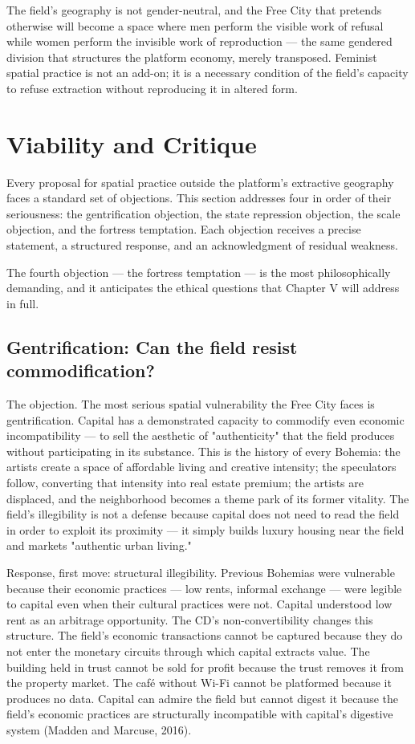 The field's geography is not gender-neutral, and the Free City that pretends otherwise will become a space where men perform the visible work of refusal while women perform the invisible work of reproduction — the same gendered division that structures the platform economy, merely transposed. Feminist spatial practice is not an add-on; it is a necessary condition of the field's capacity to refuse extraction without reproducing it in altered form.

\section{Viability and Critique}

Every proposal for spatial practice outside the platform's extractive geography faces a standard set of objections. This section addresses four in order of their seriousness: the gentrification objection, the state repression objection, the scale objection, and the fortress temptation. Each objection receives a precise statement, a structured response, and an acknowledgment of residual weakness.

The fourth objection — the fortress temptation — is the most philosophically demanding, and it anticipates the ethical questions that Chapter V will address in full.

\subsection{Gentrification: Can the field resist commodification?}

The objection. The most serious spatial vulnerability the Free City faces is gentrification. Capital has a demonstrated capacity to commodify even economic incompatibility — to sell the aesthetic of "authenticity" that the field produces without participating in its substance. This is the history of every Bohemia: the artists create a space of affordable living and creative intensity; the speculators follow, converting that intensity into real estate premium; the artists are displaced, and the neighborhood becomes a theme park of its former vitality. The field's illegibility is not a defense because capital does not need to read the field in order to exploit its proximity — it simply builds luxury housing near the field and markets "authentic urban living."

Response, first move: structural illegibility. Previous Bohemias were vulnerable because their economic practices — low rents, informal exchange — were legible to capital even when their cultural practices were not. Capital understood low rent as an arbitrage opportunity. The CD's non-convertibility changes this structure. The field's economic transactions cannot be captured because they do not enter the monetary circuits through which capital extracts value. The building held in trust cannot be sold for profit because the trust removes it from the property market. The café without Wi-Fi cannot be platformed because it produces no data. Capital can admire the field but cannot digest it because the field's economic practices are structurally incompatible with capital's digestive system (Madden and Marcuse, 2016).

